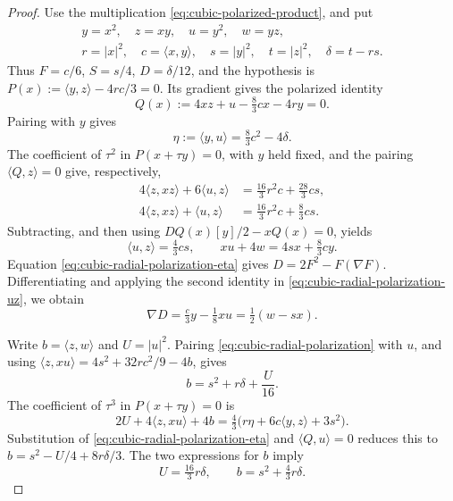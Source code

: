 \begin{proof}
Use the multiplication \eqref{eq:cubic-polarized-product}, and put
\[
 \begin{gathered}
 y=x^2,\quad z=xy,\quad u=y^2,\quad w=yz,\\
 r=|x|^2,\quad c=\langle x,y\rangle,\quad
 s=|y|^2,\quad t=|z|^2,\quad \delta=t-rs.
 \end{gathered}
\]
Thus \(F=c/6\), \(S=s/4\), \(D=\delta/12\), and the hypothesis is
\(P(x):=\langle y,z\rangle-4rc/3=0\). Its gradient gives the
polarized identity
\begin{equation}\label{eq:cubic-radial-polarization}
 Q(x):=4xz+u-\tfrac83cx-4ry=0.
\end{equation}
Pairing with \(y\) gives
\begin{equation}\label{eq:cubic-radial-polarization-eta}
 \eta:=\langle y,u\rangle=\tfrac83c^2-4\delta.
\end{equation}
The coefficient of \(\tau^2\) in \(P(x+\tau y)=0\), with \(y\)
held fixed, and the pairing \(\langle Q,z\rangle=0\) give, respectively,
\[
 \begin{aligned}
 4\langle z,xz\rangle+6\langle u,z\rangle
   &=\tfrac{16}{3}r^2c+\tfrac{28}{3}cs,\\
 4\langle z,xz\rangle+\langle u,z\rangle
   &=\tfrac{16}{3}r^2c+\tfrac83cs.
 \end{aligned}
\]
Subtracting, and then using \(DQ(x)[y]/2-xQ(x)=0\), yields
\begin{equation}\label{eq:cubic-radial-polarization-uz}
 \langle u,z\rangle=\tfrac43cs,\qquad
 xu+4w=4sx+\tfrac83cy.
\end{equation}
Equation \eqref{eq:cubic-radial-polarization-eta} gives
\(D=2F^2-F(\nabla F)\). Differentiating and applying the second
identity in \eqref{eq:cubic-radial-polarization-uz}, we obtain
\begin{equation}\label{eq:cubic-intrinsic-D-gradient}
 \nabla D=\tfrac c3y-\tfrac18xu=\tfrac12(w-sx).
\end{equation}

Write \(b=\langle z,w\rangle\) and \(U=|u|^2\). Pairing
\eqref{eq:cubic-radial-polarization} with \(u\), and using
\(\langle z,xu\rangle=4s^2+32rc^2/9-4b\), gives
\[
 b=s^2+r\delta+\frac U{16}.
\]
The coefficient of \(\tau^3\) in \(P(x+\tau y)=0\) is
\[
 2U+4\langle z,xu\rangle+4b
 =\tfrac43\bigl(r\eta+6c\langle y,z\rangle+3s^2\bigr).
\]
Substitution of \eqref{eq:cubic-radial-polarization-eta} and
\(\langle Q,u\rangle=0\) reduces this to
\(b=s^2-U/4+8r\delta/3\). The two expressions for \(b\) imply
\begin{equation}\label{eq:cubic-radial-polarization-norms}
 U=\tfrac{16}{3}r\delta,\qquad
 b=s^2+\tfrac43r\delta.
\end{equation}


\end{proof}
